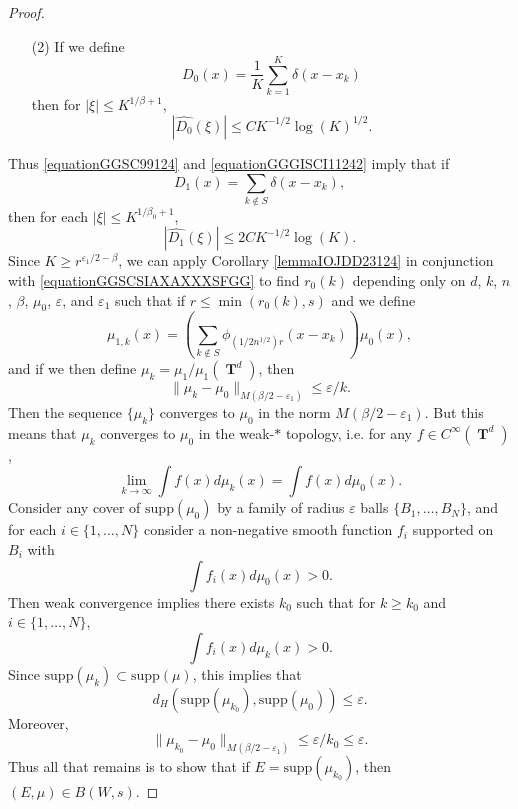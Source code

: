 \documentclass[12pt,reqno]{article}
\numberwithin{equation}{section}
\DeclareMathOperator{\TT}{\mathbf{T}}
\begin{document}
\begin{proof}
\begin{itemize}
        \item[(2)] If we define
        \[ D_0(x) = \frac{1}{K} \sum_{k = 1}^K \delta(x - x_k) \]
        then for $|\xi| \leq K^{1/\beta + 1}$,
        \begin{equation} \label{equationGGGISCI11242}
            |\widehat{D_0}(\xi)| \leq C K^{-1/2} \log(K)^{1/2}.
        \end{equation}
    \end{itemize}
    Thus \eqref{equationGGSC99124} and \eqref{equationGGGISCI11242} imply that if
    \[ D_1(x) = \sum_{k \not \in S} \delta(x - x_k), \]
    then for each $|\xi| \leq K^{1/\beta_0 + 1}$,
    \begin{equation} \label{equationGGSCSIAXAXXXSFGG}
        |\widehat{D_1}(\xi)| \leq 2C K^{-1/2} \log(K).
    \end{equation}
    Since $K \geq r^{\varepsilon_1/2 - \beta}$, we can apply Corollary \ref{lemmaIOJDD23124} in conjunction with \eqref{equationGGSCSIAXAXXXSFGG} to find $r_0(k)$ depending only on $d$, $k$, $n$, $\beta$, $\mu_0$, $\varepsilon$, and $\varepsilon_1$ such that if $r \leq \min(r_0(k),s)$ and we define
    \[ \mu_{1,k}(x) = \left( \sum_{k \not \in S} \phi_{(1/2n^{1/2}) r}(x - x_k) \right) \mu_0(x), \]
    and if we then define $\mu_k = \mu_1 / \mu_1(\TT^d)$, then
    \begin{equation} \label{equationvVVV323285853S}
        \| \mu_k - \mu_0 \|_{M(\beta/2 - \varepsilon_1)} \leq \varepsilon/k.
    \end{equation}
    Then the sequence $\{ \mu_k \}$ converges to $\mu_0$ in the norm $M(\beta/2-\varepsilon_1)$. But this means that $\mu_k$ converges to $\mu_0$ in the weak-$*$ topology, i.e. for any $f \in C^\infty(\TT^d)$,
    \[ \lim_{k \to \infty} \int f(x) d\mu_k(x) = \int f(x) d\mu_0(x). \]
    Consider any cover of $\text{supp}(\mu_0)$ by a family of radius $\varepsilon$ balls $\{ B_1, \dots, B_N \}$, and for each $i \in \{ 1, \dots, N \}$ consider a non-negative smooth function $f_i$ supported on $B_i$ with
    \[ \int f_i(x) d\mu_0(x) > 0. \]
    Then weak convergence implies there exists $k_0$ such that for $k \geq k_0$ and $i \in \{ 1, \dots, N \}$,
    \[ \int f_i(x) d\mu_k(x) > 0. \]
    Since $\text{supp}(\mu_k) \subset \text{supp}(\mu)$, this implies that
    \[ d_H(\text{supp}(\mu_{k_0}), \text{supp}(\mu_0)) \leq \varepsilon. \]
    Moreover, 
    \[ \| \mu_{k_0} - \mu_0 \|_{M(\beta/2 - \varepsilon_1)} \leq \varepsilon / k_0 \leq \varepsilon. \]
    Thus all that remains is to show that if $E = \text{supp}(\mu_{k_0})$, then $(E,\mu) \in B(W,s)$.


\end{proof}
\end{document}
